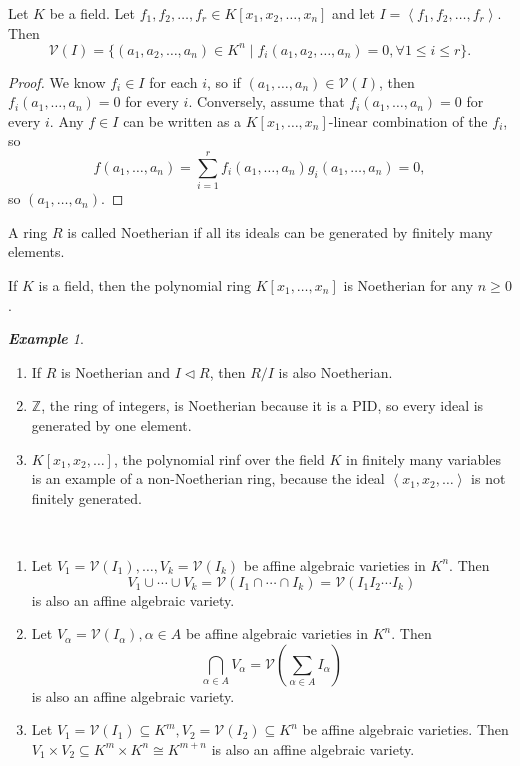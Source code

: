 \documentclass[titlepage]{article}
\theoremstyle{remark}
\newtheorem{example}[definition]{\textbf{Example}}
\newcommand{\idealgen}[1]{\ensuremath{\left\langle#1\right\rangle}}
\newcommand{\seq}[2]{\ensuremath{#1_1,\dots,#1_{#2}}}
\begin{document}
  \begin{proposition}
    Let $K$ be a field. Let $f_1,f_2,\dots,f_r\in K[x_1,x_2,\dots,x_n]$ and let $I=\idealgen{f_1,f_2,\dots,f_r}$. Then
    \[\mathcal{V}(I)=\{(a_1,a_2,\dots,a_n)\in K^n\mid f_i(a_1,a_2,\dots,a_n)=0, \forall 1\le i\le r\}.\]
  \end{proposition}
  \begin{proof}
    We know $f_i\in I$ for each $i$, so if $(a_1,\dots,a_n)\in\mathcal{V}(I)$, then $f_i(a_1,\dots,a_n)=0$ for every $i$.
    Conversely, assume that $f_i(a_1,\dots,a_n)=0$ for every $i$. Any $f\in I$ can be written as a $K[x_1,\dots,x_n]$-linear combination of the $f_i$, so
    \[f(a_1,\dots,a_n)=\sum_{i=1}^rf_i(a_1,\dots,a_n)g_i(a_1,\dots,a_n)=0,\]
    so $(\seq{a}{n})$.
  \end{proof}
  \begin{definition}
    A ring $R$ is called Noetherian if all its ideals can be generated by finitely many elements.
  \end{definition}
  \begin{theorem}
    If $K$ is a field, then the polynomial ring $K[\seq{x}{n}]$ is Noetherian for any $n\ge0$.
  \end{theorem}
  \begin{example}$ $
    \begin{enumerate}
      \item If $R$ is Noetherian and $I\vartriangleleft R$, then $R/I$ is also Noetherian.
      \item $\mathbb{Z}$, the ring of integers, is Noetherian because it is a PID, so every ideal is generated by one element.
      \item $K[x_1,x_2,\dots]$, the polynomial rinf over the field $K$ in finitely many variables is an example of a non-Noetherian ring, because the ideal $\idealgen{x_1,x_2,\dots}$ is not finitely generated.
    \end{enumerate}
  \end{example}
  \begin{proposition}\label{1.8}$ $
    \begin{enumerate}
      \item Let $V_1=\mathcal{V}(I_1),\dots,V_k=\mathcal{V}(I_k)$ be affine algebraic varieties in $K^n$. Then
        \[V_1\cup\cdots\cup V_k=\mathcal{V}(I_1\cap\cdots\cap I_k)=\mathcal{V}(I_1I_2\cdots I_k)\]
        is also an affine algebraic variety.
      \item Let $V_\alpha=\mathcal{V}(I_\alpha),\alpha\in A$ be affine algebraic varieties in $K^n$. Then
        \[\bigcap_{\alpha\in A}V_\alpha=\mathcal{V}\left(\sum_{\alpha\in A}I_\alpha\right)\]
        is also an affine algebraic variety.
      \item Let $V_1=\mathcal{V}(I_1)\subseteq K^m, V_2=\mathcal{V}(I_2)\subseteq K^n$ be affine algebraic varieties. Then $V_1\times V_2\subseteq K^m\times K^n\cong K^{m+n}$ is also an affine algebraic variety.
    \end{enumerate}
  \end{proposition}
\end{document}
